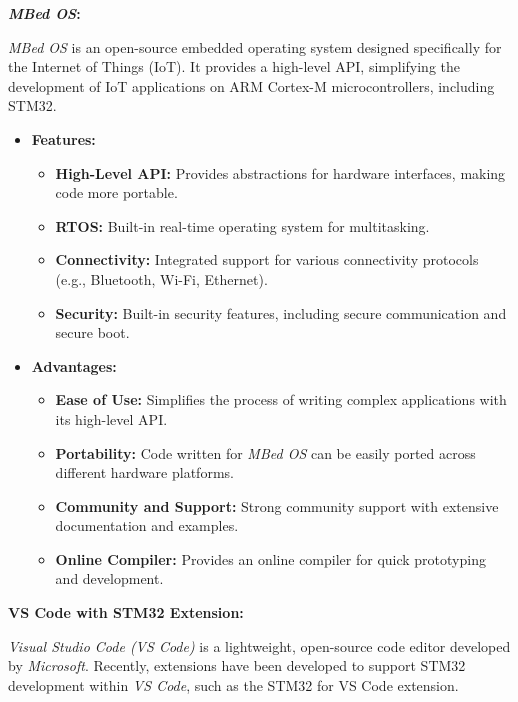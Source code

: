 \documentclass[10pt,a4paper,onecolumn]{article}
\begin{document}
\textbf{\textit{MBed OS}:}

\textit{MBed OS} is an open-source embedded operating system designed specifically for the Internet of Things (IoT). It provides a high-level API, simplifying the development of IoT applications on ARM Cortex-M microcontrollers, including STM32.

\begin{itemize}
  \item \textbf{Features:}
    \begin{itemize}
      \item \textbf{High-Level API:} Provides abstractions for hardware interfaces, making code more portable.
      \item \textbf{RTOS:} Built-in real-time operating system for multitasking.
      \item \textbf{Connectivity:} Integrated support for various connectivity protocols (e.g., Bluetooth, Wi-Fi, Ethernet).
      \item \textbf{Security:} Built-in security features, including secure communication and secure boot.
    \end{itemize}
  \item \textbf{Advantages:}
    \begin{itemize}
      \item \textbf{Ease of Use:} Simplifies the process of writing complex applications with its high-level API.
      \item \textbf{Portability:} Code written for \textit{MBed OS} can be easily ported across different hardware platforms.
      \item \textbf{Community and Support:} Strong community support with extensive documentation and examples.
      \item \textbf{Online Compiler:} Provides an online compiler for quick prototyping and development.
    \end{itemize}
\end{itemize}

\textbf{VS Code with STM32 Extension:}

\textit{Visual Studio Code (VS Code)} is a lightweight, open-source code editor developed by \textit{Microsoft}. Recently, extensions have been developed to support STM32 development within \textit{VS Code}, such as the STM32 for VS Code extension.
\end{document}
